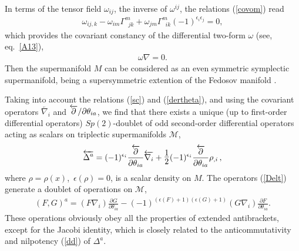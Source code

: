 \documentclass[a4paper,11pt]{article}
\begin{document}
In terms of the tensor field $\omega _{ij}$, the inverse of
$\omega ^{ij}$, the relations (\ref{covom}) read
\begin{eqnarray}
\label{covomiv} \omega_{ij,k}-\omega_{im}\Gamma^m_{\;\;jk}+
\omega_{jm}\Gamma^m_{\;\;ik}(-1)^{\epsilon_i\epsilon_j}=0,
\end{eqnarray}
which provides the covariant constancy of the differential
two-form $\omega $ (see, eq.~\ref{A13}),
\begin{eqnarray}
\label{covform}
\omega\nabla=0.
\end{eqnarray}
Then the supermanifold $M$ can be considered as an even symmetric
symplectic supermanifold, being a supersymmetric extention of the
Fedosov manifold \cite {F,fm}.

Taking into account the relations (\ref{sc}) and (\ref{dertheta}), and using
the covariant operators $\overleftarrow{\nabla _{i}}$ and $\overleftarrow{%
\partial}/\partial \theta _{ia}$, we find that there exists a
unique (up to first-order differential operators) $Sp(2)$-doublet of odd
second-order differential operators acting as scalars on triplectic
supermanifolds $\mathcal{M}$,
\begin{eqnarray}
    \label{Delt}
    \overleftarrow{\Delta^a}=(-1)^{\epsilon_i}
    \frac{\overleftarrow{\partial}}{\partial\theta_{ia}}
    \overleftarrow{\nabla_i}+
    \hbox{\Large$\frac{1}{2}$}(-1)^{\epsilon_i}
    \frac{\overleftarrow{\partial}}{\partial\theta_{ia}}\rho_{,i}\,,
\end{eqnarray}
where $\rho =\rho (x)$,\ $\epsilon (\rho )=0$, is a scalar density on $M$.
The operators (\ref{Delt}) generate a doublet of operations on $\mathcal{M}$,
\begin{eqnarray}
\label{2op} (F,G)^a=(F{\nabla_i})\frac{\partial
G}{\partial\theta_{ia}}-
(-1)^{(\epsilon(F)+1)(\epsilon(G)+1)}(G{\nabla_i}) \frac{\partial
F}{\partial\theta_{ia}}.
\end{eqnarray}
These operations obviously obey all the properties of extended antibrackets,
except for the Jacobi identity, which is closely related to the
anticommutativity and nilpotency (\ref{dd}) of $\Delta ^{a}$.
\end{document}
